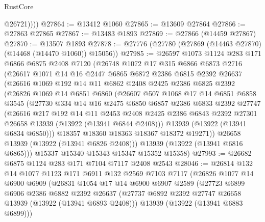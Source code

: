 \begin{lexlean}{RustCore}
\begin{coremodule}
            @26721))))
@27864 := @13412 @1060
@27865 := @13609 @27864
@27866 := @27863 @27865
@27867 := @13483 @1893
@27869 := @27866 (@14459 @27867)
@27870 := @13507 @1893
@27878 := @27776 (@27780 (@27869 (@14463 @27870) (@14468 (@14470 @1060)) @15056))
@27985 := @26597
    @1073
    @1124
    @283
    @171
    @6866
    @6875
    @2408
    @7120
    (@26748
      @1072
      @17
      @315
      @6866
      @6873
      @2716
      (@26617
        @1071
        @14
        @16
        @2447
        @6865
        @6872
        @2386
        @6815
        @2392
        @26637
        (@26616
          @1069
          @192
          @14
          @11
          @6862
          @2408
          @2425
          @2386
          @6825
          @2392
          (@26826
            @1069
            @14
            @6851
            @6860
            (@26607
              @507
              @1068
              @17
              @14
              @6851
              @6858
              @3545
              (@27730
                @334
                @14
                @16
                @2475
                @6850
                @6857
                @2386
                @6833
                @2392
                @27747
                (@26616
                  @217
                  @192
                  @14
                  @11
                  @2453
                  @2408
                  @2425
                  @2386
                  @6843
                  @2392
                  @27301
                  @26658
                  @13939
                  (@13922 (@13941 @6844 @2408)))
                @13939
                (@13922 (@13941 @6834 @6850)))
              @18357
              @18360
              @18363
              @18367
              @18372
              @19271))
          @26658
          @13939
          (@13922 (@13941 @6826 @2408)))
        @13939
        (@13922 (@13941 @6816 @6865)))
      @15337
      @15340
      @15343
      @15347
      @15352
      @15358)
@27993 := @26682 @6875 @1124 @283 @171 @7104 @7117 @2408 @2543
@28046 := @26814
    @132
    @14
    @1077
    @1123
    @171
    @6911
    @132
    @2569
    @7103
    @7117
    (@26826
      @1077
      @14
      @6900
      @6909
      (@26831
        @1054
        @17
        @14
        @6900
        @6907
        @2589
        (@27723
          @6899
          @6906
          @2386
          @6882
          @2392
          @26637
          (@27737 @6892 @2392 @27747 @26658 @13939 (@13922 (@13941 @6893 @2408)))
          @13939
          (@13922 (@13941 @6883 @6899)))

\end{coremodule}
\end{lexlean}
